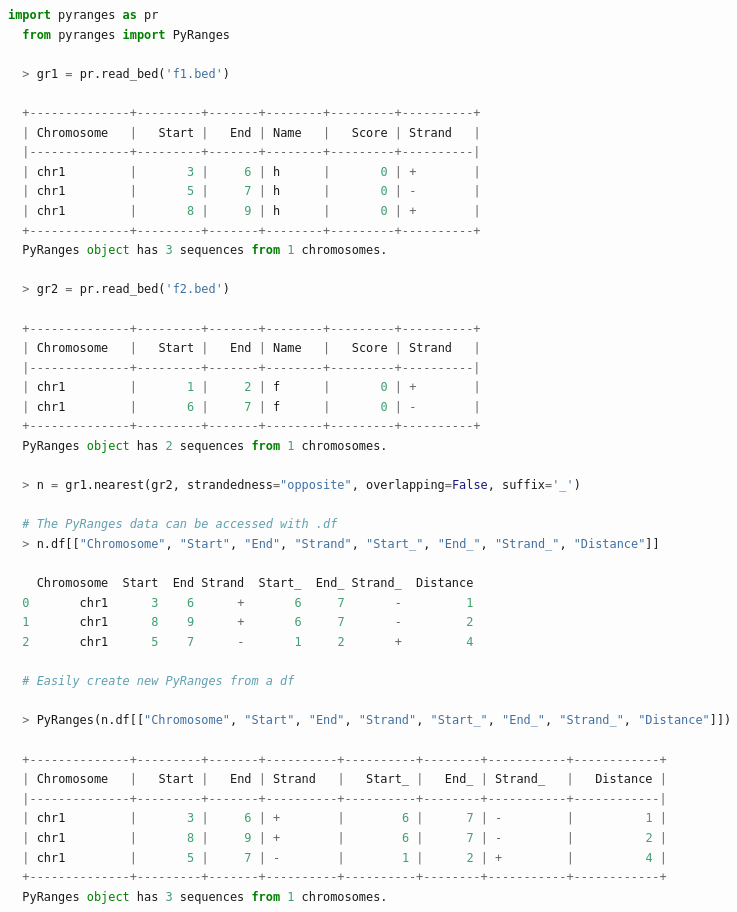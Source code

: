 \documentclass[10pt,letterpaper]{article}
\begin{document}
\begin{adjustwidth}{-2in}{0in}
\begin{flushright}
\begin{lstlisting}[language=Python, linewidth=30cm, basicstyle=\small]
  import pyranges as pr
  from pyranges import PyRanges

  > gr1 = pr.read_bed('f1.bed')

  +--------------+---------+-------+--------+---------+----------+
  | Chromosome   |   Start |   End | Name   |   Score | Strand   |
  |--------------+---------+-------+--------+---------+----------|
  | chr1         |       3 |     6 | h      |       0 | +        |
  | chr1         |       5 |     7 | h      |       0 | -        |
  | chr1         |       8 |     9 | h      |       0 | +        |
  +--------------+---------+-------+--------+---------+----------+
  PyRanges object has 3 sequences from 1 chromosomes.

  > gr2 = pr.read_bed('f2.bed')

  +--------------+---------+-------+--------+---------+----------+
  | Chromosome   |   Start |   End | Name   |   Score | Strand   |
  |--------------+---------+-------+--------+---------+----------|
  | chr1         |       1 |     2 | f      |       0 | +        |
  | chr1         |       6 |     7 | f      |       0 | -        |
  +--------------+---------+-------+--------+---------+----------+
  PyRanges object has 2 sequences from 1 chromosomes.

  > n = gr1.nearest(gr2, strandedness="opposite", overlapping=False, suffix='_')

  # The PyRanges data can be accessed with .df
  > n.df[["Chromosome", "Start", "End", "Strand", "Start_", "End_", "Strand_", "Distance"]]

    Chromosome  Start  End Strand  Start_  End_ Strand_  Distance
  0       chr1      3    6      +       6     7       -         1
  1       chr1      8    9      +       6     7       -         2
  2       chr1      5    7      -       1     2       +         4

  # Easily create new PyRanges from a df

  > PyRanges(n.df[["Chromosome", "Start", "End", "Strand", "Start_", "End_", "Strand_", "Distance"]])

  +--------------+---------+-------+----------+----------+--------+-----------+------------+
  | Chromosome   |   Start |   End | Strand   |   Start_ |   End_ | Strand_   |   Distance |
  |--------------+---------+-------+----------+----------+--------+-----------+------------|
  | chr1         |       3 |     6 | +        |        6 |      7 | -         |          1 |
  | chr1         |       8 |     9 | +        |        6 |      7 | -         |          2 |
  | chr1         |       5 |     7 | -        |        1 |      2 | +         |          4 |
  +--------------+---------+-------+----------+----------+--------+-----------+------------+
  PyRanges object has 3 sequences from 1 chromosomes.


\end{lstlisting}
\end{flushright}
\end{adjustwidth}
\end{document}
